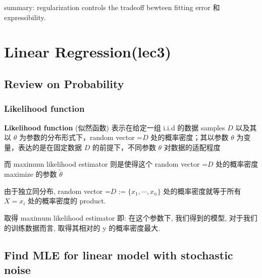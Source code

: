 \documentclass[lang=cn,11pt]{elegantbook}
\begin{document}

summary: regularization controls the tradeoff bewteen fitting error 和
expressibility.

\hypertarget{linear-regressionlec3}{%
\chapter{Linear Regression(lec3)}\label{linear-regressionlec3}}

\hypertarget{review-on-probability}{%
\section{Review on Probability}\label{review-on-probability}}


\hypertarget{likelihood-function}{%
\subsection{Likelihood function}\label{likelihood-function}}

\textbf{Likelihood function} (似然函数) 表示在给定一组 i.i.d 的数据
samples \(D\) 以及其以 \(\theta\) 为参数的分布形式下，random vector
=\(D\) 处的概率密度；其以参数 \(\theta\) 为变量，表达的是在固定数据
\(D\) 的前提下，不同参数 \(\theta\) 对数据的适配程度

而 maximum likelihood estimator 则是使得这个 random vector =\(D\)
处的概率密度 maximize 的参数 \(\tilde{\theta}\)

由于独立同分布, random vector =\(D:=\{x_1,\cdots,x_n\}\)
处的概率密度就等于所有 \(X=x_i\) 处的概率密度的 product.

取得 maximum likelihood estimator 即: 在这个参数下, 我们得到的模型,
对于我们的训练数据而言, 取得其相对的 y 的概率密度最大.


\hypertarget{find-mle-for-linear-model-with-stochastic-noise}{%
\section{Find MLE for linear model with stochastic
noise}\label{find-mle-for-linear-model-with-stochastic-noise}}

\end{document}
